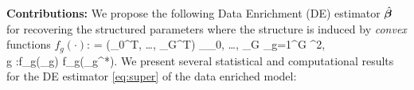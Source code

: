 {\bf Contributions:}
We propose the following Data Enrichment (DE) estimator $\hat{\boldsymbol{\beta}}$ for recovering the structured parameters where the structure is induced by \emph{convex} functions $f_g(\cdot)$:
{\small\be
	\label{eq:super}
	\hbbe = (\hbbe_0^T, \dots, \hbbe_G^T) \in \argmin_{\bbeta _0, \dots, \bbeta _G}  \sum_{g=1}^{G} ^2,
	\\ \nr
	 \quad \forall g \in [G]:f_g(\bbeta _g) \leq f_g(\bbeta _g^*).
\ee}
We present several statistical and computational results for the DE estimator \eqref{eq:super} of the data enriched model:
